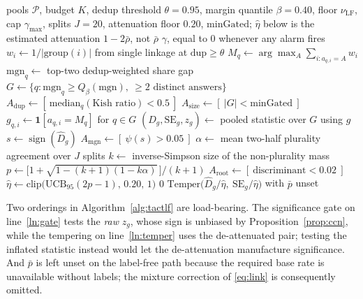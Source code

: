 \documentclass{article}
\newcommand{\Dhat}{\widehat{D}}
\newcommand{\sign}{\operatorname{sign}}
\newcommand{\SC}{\textsc{sc}}
\newcommand{\TACT}{\textsc{tact}}
\begin{document}
\begin{algorithm}[t]
\caption{\TACT-LF: recovering the sign without labels}
\label{alg:tactlf}
\begin{algorithmic}[1]
\Require pools $\mathcal{P}$, budget $K$, dedup threshold $\theta{=}0.95$,
margin quantile $\beta{=}0.40$, floor $\nu_{\mathrm{LF}}$, cap $\gamma_{\max}$,
splits $J{=}20$, attenuation floor $0.20$, $\mathrm{minGated}$; $\hat\eta$ below is the
estimated attenuation $1-2\bar\rho$, not $\bar\rho$
\Ensure $\gamma$, equal to $0$ whenever any alarm fires
  \State $w_i\gets 1/|\text{group}(i)|$ from single linkage at $\mathrm{dup}\ge\theta$
  \State $M_q\gets\arg\max_A\sum_{i:a_{q,i}=A}w_i$ 
  \State $\mathrm{mgn}_q\gets$ top-two dedup-weighted share gap
\EndFor
\State $G\gets\{q:\mathrm{mgn}_q\ge Q_\beta(\mathrm{mgn}),\ \text{$\ge 2$ distinct answers}\}$
\State $A_{\mathrm{dup}}\gets[\ \mathrm{median}_q(\text{Kish ratio})<0.5\ ]$ 
\State $A_{\mathrm{size}}\gets[\ |G|<\mathrm{minGated}\ ]$
\State $g_{q,i}\gets\mathbf{1}[a_{q,i}=M_q]$ for $q\in G$
\State $(\Dhat_g,\mathrm{SE}_g,z_g)\gets$ pooled statistic over $G$ using $g$
\State $s\gets\sign(\Dhat_g)$ 
\State $A_{\mathrm{mgn}}\gets[\ \psi(s)>0.05\ ]$ 
\State $\alpha\gets$ mean two-half plurality agreement over $J$ splits
\State $k\gets$ inverse-Simpson size of the non-plurality mass
\State $p\gets\big[1+\sqrt{1-(k{+}1)(1-k\alpha)}\,\big]/(k{+}1)$
\State $A_{\mathrm{root}}\gets[\ \text{discriminant}<0.02\ ]$ 
\State $\hat\eta\gets\mathrm{clip}\big(\mathrm{UCB}_{95}(2p-1),\,0.20,\,1\big)$
 \label{ln:gate}
  \State \Return $0$ \Comment{refuse; the vote stays \SC}
\EndIf
\State \Return $\mathrm{Temper}\big(\Dhat_g/\hat\eta,\ \mathrm{SE}_g/\hat\eta\big)$ with $\bar p$ unset \label{ln:temper}
\end{algorithmic}
\end{algorithm}

Two orderings in Algorithm~\ref{alg:tactlf} are load-bearing. The significance
gate on line~\ref{ln:gate} tests the \emph{raw} $z_g$, whose sign is unbiased by
Proposition~\ref{prop:ccn}, while the tempering on line~\ref{ln:temper} uses
the de-attenuated pair; testing the inflated statistic instead would let the
de-attenuation manufacture significance. And $\bar p$ is left unset on the
label-free path because the required base rate is unavailable without labels;
the mixture correction of \eqref{eq:link} is consequently omitted.
\end{document}
